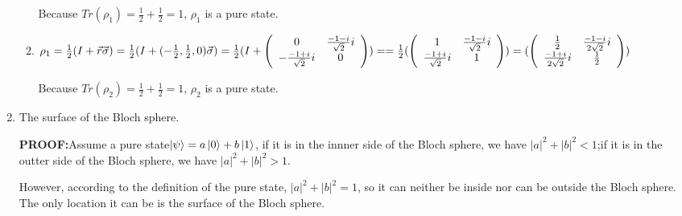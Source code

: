 \documentclass{article}
\begin{document}
\begin{enumerate}
\begin{enumerate}
                    Because $Tr(\rho_1)=\frac{1}{2}+\frac{1}{2}=1$, $\rho_1$ is a pure state.
              \item $\rho_1
                        \\=\frac{1}{2}(I+\vec{r}\vec{\sigma})
                        \\=\frac{1}{2}(I+(-\frac{1}{2},\frac{1}{2},0)\vec{\sigma})
                        \\=\frac{1}{2}(I+\left(
                        \begin{array}{cc}
                                0 & \frac{-1-i}{\sqrt{2}}i \\-\frac{-1+i}{\sqrt{2}}i&0\\
                            \end{array}
                        \right))
                        \\==\frac{1}{2}(\left(
                        \begin{array}{cc}
                                1 & \frac{-1-i}{\sqrt{2}}i \\\frac{-1+i}{\sqrt{2}}i&1\\
                            \end{array}
                        \right))
                        \\=(\left(
                        \begin{array}{cc}
                                \frac{1}{2} & \frac{-1-i}{2\sqrt{2}}i \\\frac{-1+i}{2\sqrt{2}}i&\frac{1}{2}\\
                            \end{array}
                        \right))
                    $

                    Because $Tr(\rho_2)=\frac{1}{2}+\frac{1}{2}=1$, $\rho_2$ is a pure state.
          \end{enumerate}
    \item The surface of the Bloch sphere.

          \textbf{PROOF:}Assume a pure state$\ket{\psi}=a\ket{0}+b\ket{1}$, if it is in the innner side of the Bloch sphere, we have $|a|^2+|b|^2<1$;if it is in the outter side of the Bloch sphere, we have $|a|^2+|b|^2>1$.

          However, according to the definition of the pure state, $|a|^2+|b|^2=1$, so it can neither be inside nor can be outside the Bloch sphere. The only location it can be is the surface of the Bloch sphere.


\end{enumerate}
\end{document}
